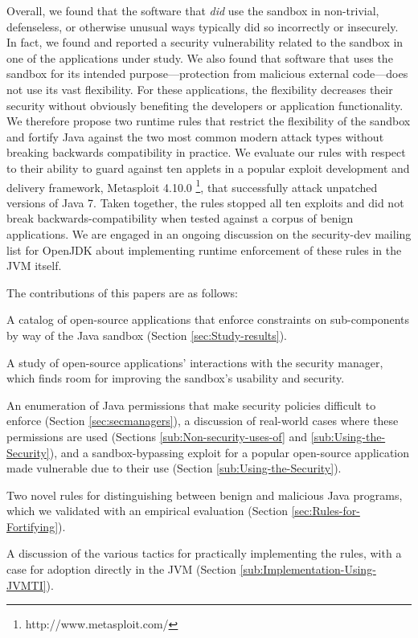 \documentclass{sig-alternate}
\begin{document}
Overall, we found that the software that \emph{did} use the sandbox in
non-trivial, defenseless, or otherwise
unusual ways typically did so incorrectly or insecurely. In fact, we found and reported a
security vulnerability related to the sandbox in one of the applications under study. We also found that
software that uses the sandbox for its intended
purpose---protection from malicious external code---does not use its
vast flexibility. For these applications, the flexibility decreases their security without
obviously benefiting the developers or application functionality. We therefore propose
two runtime rules that restrict the flexibility of the sandbox and fortify Java
against the two most common modern attack types without breaking backwards
compatibility in practice. We evaluate our rules
with respect to their ability to guard against ten applets in a popular exploit development
and delivery framework, Metasploit
4.10.0%
\footnote{http://www.metasploit.com/}, that successfully attack unpatched
versions of Java 7.
Taken together, the rules stopped all ten exploits and did not break
backwards-compatibility
when tested against a corpus of benign applications.
We are engaged in an
ongoing discussion on the security-dev mailing list for OpenJDK about
implementing runtime enforcement of these rules in the JVM itself.


The contributions of this papers are as follows:
\begin{flushitem} \setlength{\parskip}{0pt}
\setlength{\parsep}{0pt}
\setlength{\itemsep}{0pt}
\item A catalog of open-source applications that enforce constraints on
sub-components by way of the Java sandbox (Section \ref{sec:Study-results}).
\item A study of open-source applications' interactions with the security
manager, which finds room for improving the sandbox's usability and security.
\item An enumeration of Java permissions that make security policies difficult
to enforce (Section \ref{sec:secmanagers}), a discussion of real-world cases
where these permissions are used (Sections \ref{sub:Non-security-uses-of} and
\ref{sub:Using-the-Security}), and a sandbox-bypassing exploit for a popular
open-source application made vulnerable due to their use (Section
\ref{sub:Using-the-Security}).
\item Two novel rules for distinguishing between benign and malicious Java
programs, which we validated with an empirical evaluation (Section
\ref{sec:Rules-for-Fortifying}).
\item A discussion of the various tactics for practically implementing the
rules, with a case for adoption directly in the JVM (Section
\ref{sub:Implementation-Using-JVMTI}).
\end{flushitem}
\end{document}
